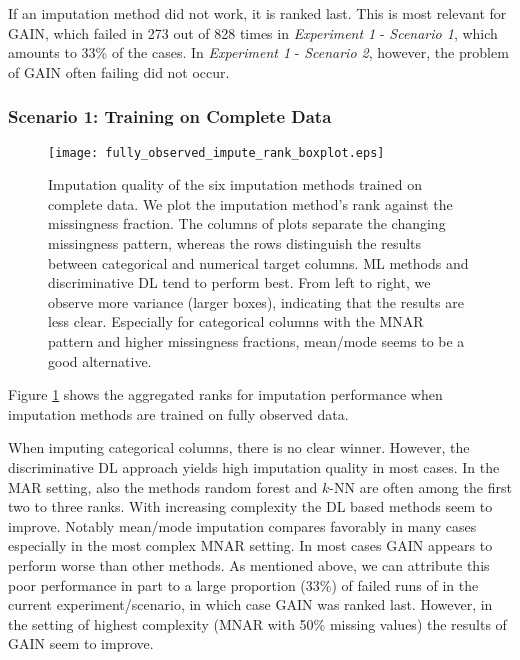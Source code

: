 If an imputation method did not work, it is ranked last. This is most relevant for GAIN, which failed in 273 out of 828 times in \textit{Experiment 1} - \textit{Scenario 1}, which amounts to 33\% of the cases. In \textit{Experiment 1} - \textit{Scenario 2}, however, the problem of GAIN often failing did not occur.


\subsubsection{Scenario 1: Training on Complete Data}
\label{sec:results_experiment1_scenario1}

\begin{figure}\centering
    \texttt{[image: fully\_observed\_impute\_rank\_boxplot.eps]}
    \caption[Imputation Ranks - Fully Observed]{Imputation quality of the six imputation methods trained on complete data. We plot the imputation method's rank against the missingness fraction. The columns of plots separate the changing missingness pattern, whereas the rows distinguish the results between categorical and numerical target columns. ML methods and discriminative DL tend to perform best. From left to right, we observe more variance (larger boxes), indicating that the results are less clear. Especially for categorical columns with the MNAR pattern and higher missingness fractions, mean/mode seems to be a good alternative.
	}
	\label{fig:fully_observed_impute_rank_boxplot}
\end{figure}

Figure \ref{fig:fully_observed_impute_rank_boxplot} shows the aggregated ranks for imputation performance when imputation methods are trained on fully observed data.

When imputing categorical columns, there is no clear winner. However, the discriminative DL approach yields high imputation quality in most cases. In the MAR setting, also the methods random forest and $k$-NN are often among the first two to three ranks. With increasing complexity the DL based methods seem to improve. Notably mean/mode imputation compares favorably in many cases especially in the most complex MNAR setting. In most cases GAIN appears to perform worse than other methods. As mentioned above, we can attribute this poor performance in part to a large proportion (33\%) of failed runs of in the current experiment/scenario, in which case GAIN was ranked last. However, in the setting of highest complexity (MNAR with 50\% missing values) the results of GAIN seem to improve.

